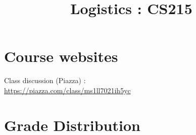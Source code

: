 \documentclass{article}
\title{Logistics : CS215}
\date{}
\begin{document}
\maketitle

\section{Course websites}
Class discussion (Piazza) : \\\url{https://piazza.com/class/ms1ll7021ih5yc}

\section{Grade Distribution}
\begin{tikzpicture}
\end{tikzpicture}
\end{document}
